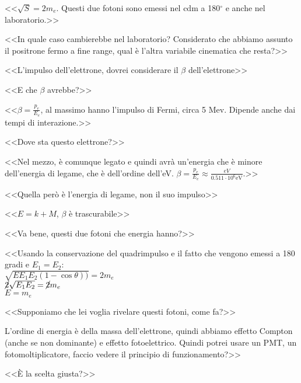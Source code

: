 \documentclass[../main.tex]{subfiles}
\begin{document}
\begin{enumerate}
{        \begin{flushright}
        <<$\sqrt{S}=2m_e$. Questi due fotoni sono emessi nel cdm a 180$^\circ$ e anche nel laboratorio.>>
        \end{flushright}
        <<In quale caso cambierebbe nel laboratorio? Considerato che abbiamo assunto il positrone fermo a fine range, qual è l'altra variabile cinematica che resta?>>
        \begin{flushright}
        <<L'impulso dell'elettrone, dovrei considerare il $\beta$ dell'elettrone>>
        \end{flushright}
        <<E che $\beta$ avrebbe?>>
        \begin{flushright}
        <<$\beta=\frac{p_e}{E_e}$, al massimo hanno l'impulso di Fermi, circa 5 Mev. Dipende anche dai tempi di interazione.>>
        \end{flushright}
        <<Dove sta questo elettrone?>>
        \begin{flushright}
        <<Nel mezzo, è comunque legato e quindi avrà un'energia che è minore dell'energia di legame, che è dell'ordine dell'eV. \(\beta=\frac{p_e}{E_e}\approx\frac{eV}{0.511\cdot10^6\textrm{eV}}\).>>
        \end{flushright}
        <<Quella però è l'energia di legame, non il suo impulso>>
        \begin{flushright}
        <<$E=k+M$, $\beta$ è trascurabile>>
        \end{flushright}
        <<Va bene, questi due fotoni che energia hanno?>>
        \begin{flushright}
        <<Usando la conservazione del quadrimpulso e il fatto che vengono emessi a 180 gradi e $E_1=E_2$:\\ \(\sqrt{EE_1E_2\left(1-\cos{\theta}\right))}=2m_e\)\\
        \(\cancel{2}\sqrt{E_1E_2}=\cancel{2}m_e\)\\
        \(E=m_e\)
        \end{flushright}
        <<Supponiamo che lei voglia rivelare questi fotoni, come fa?>>
        \begin{flushright}
        L'ordine di energia è della massa dell'elettrone, quindi abbiamo effetto Compton (anche se non dominante) e effetto fotoelettrico. Quindi potrei usare un PMT, un fotomoltiplicatore, faccio vedere il principio di funzionamento?>>
        \end{flushright}
        <<È la scelta giusta?>>
        \begin{flushright}

\end{flushright}}
\end{enumerate}
\end{document}
